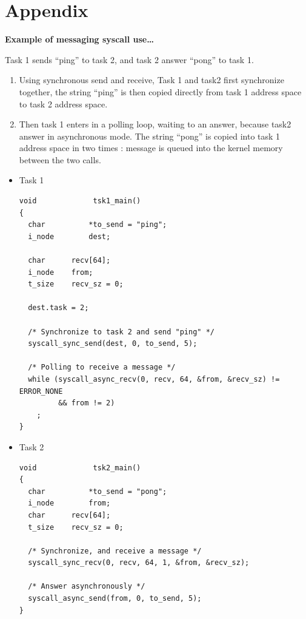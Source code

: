 %
%

\newpage

\section{Appendix}

\textbf{Example of messaging syscall use\ldots}

Task 1 sends ``ping'' to task 2, and task 2 answer ``pong'' to task 1.

\begin{enumerate}
  \item Using synchronous send and receive, Task 1 and task2 first
  synchronize together, the string ``ping'' is then copied directly from task 1
  address space to task 2 address space.

  \item	Then task 1 enters in a polling loop, waiting to an answer, because
  task2 answer in asynchronous mode. The string ``pong'' is copied into task 1
  address space in two times : message is queued into the kernel memory between
  the two calls.
\end{enumerate}

\begin{itemize}
  \item Task 1

\begin{verbatim}
void             tsk1_main()
{
  char          *to_send = "ping";
  i_node        dest;

  char		recv[64];
  i_node	from;
  t_size	recv_sz = 0;

  dest.task = 2;

  /* Synchronize to task 2 and send "ping" */
  syscall_sync_send(dest, 0, to_send, 5);

  /* Polling to receive a message */
  while (syscall_async_recv(0, recv, 64, &from, &recv_sz) != ERROR_NONE
         && from != 2)
    ;
}
\end{verbatim}

  \item Task 2

\begin{verbatim}
void             tsk2_main()
{
  char          *to_send = "pong";
  i_node        from;
  char		recv[64];
  t_size	recv_sz = 0;

  /* Synchronize, and receive a message */
  syscall_sync_recv(0, recv, 64, 1, &from, &recv_sz);

  /* Answer asynchronously */
  syscall_async_send(from, 0, to_send, 5);
}
\end{verbatim}

\end{itemize}
